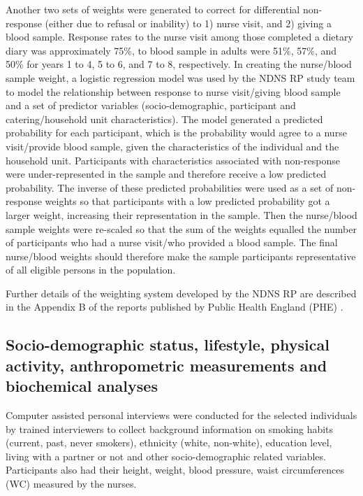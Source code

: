 Another two sets of weights were generated to correct for differential non-response (either due to refusal or inability) to 1) nurse visit, and 2) giving a blood sample. Response rates to the nurse visit among those completed a dietary diary was approximately 75\%, to blood sample in adults were 51\%, 57\%, and 50\% for years 1 to 4, 5 to 6, and 7 to 8, respectively. In creating the nurse/blood sample weight, a logistic regression model was used by the NDNS RP study team to model the relationship between response to nurse visit/giving blood sample and a set of predictor variables (socio-demographic, participant and catering/household unit characteristics). The model generated a predicted probability for each participant, which is the probability would agree to a nurse visit/provide blood sample, given the characteristics of the individual and the household unit. Participants with characteristics associated with non-response were under-represented in the sample and therefore receive a low predicted probability. The inverse of these predicted probabilities were used as a set of non-response weights so that participants with a low predicted probability got a larger weight, increasing their representation in the sample. Then the nurse/blood sample weights were re-scaled so that the sum of the weights equalled the number of participants who had a nurse visit/who provided a blood sample. The final nurse/blood weights should therefore make the sample participants representative of all eligible persons in the population. 

Further details of the weighting system developed by the NDNS RP are described in the Appendix B of the reports published by Public Health England (PHE) \parencite{bates2014national,roberts2018national,NDNSofficial}.\vspace{-0.6cm}

\subsection{Socio-demographic status, lifestyle, physical activity, anthropometric measurements and biochemical analyses}\vspace{-0.3cm}

Computer assisted personal interviews were conducted for the selected individuals by trained interviewers to collect background information on smoking habits (current, past, never smokers), ethnicity (white, non-white), education level, living with a partner or not and other socio-demographic related variables. Participants also had their height, weight, blood pressure, waist circumferences (WC) measured by the nurses. 

